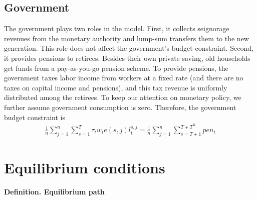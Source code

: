 \documentclass[12pt]{article}
\begin{document}
\subsection{Government}
The government plays two roles in the model. First, it collects seignorage revenues from the monetary authority and lump-sum transfers them to the new generation. This role does not affect the government's budget constraint. Second, it provides pensions to retirees. Besides their own private saving, old households get funds from a pay-as-you-go pension scheme. To provide pensions, the government taxes labor income from workers at a fixed rate (and there are no taxes on capital income and pensions), and this tax revenue is uniformly distributed among the retirees. To keep our attention on monetary policy, we further assume government consumption is zero. Therefore, the government budget constraint is 
\begin{eqnarray}
\frac{1}{n}\sum_{j=1}^{n}\sum_{s=1}^{T}\tau_tw_te(s,j)l_{t}^{s,j}= \frac{1}{n} \sum_{j=1}^{n}\sum_{s=T+1}^{T+T^R}pen_t
\end{eqnarray}


\section{Equilibrium conditions}
\textbf{Definition. Equilibrium path} 
\end{document}
